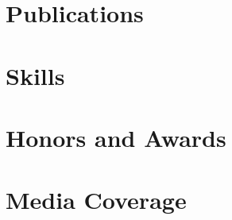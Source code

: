 		
	
		
	
		

	\section{Publications}
	
	

	\section{Skills}

	
	
	\section{Honors and Awards}
	
	

	\section{Media Coverage}

	
	


